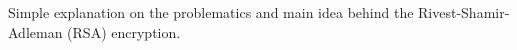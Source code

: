 ﻿Simple explanation on the problematics and main idea behind the Rivest-Shamir-Adleman (RSA) encryption.
